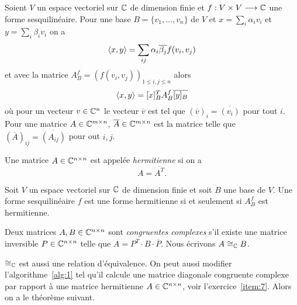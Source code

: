 Soient $V$ un espace vectoriel sur $\mathbb{C}$ de dimension finie et $f: V \times V \longrightarrow \mathbb{C}$ une forme sesquilinéaire. Pour une base  $B = \{v_1,\dots,v_n\}$ de $V$ et $x = \sum_i \alpha_i v_i$ et $y = \sum_i \beta_i v_i$ on a 
\begin{displaymath}
  \langle {x,y} \rangle = \sum_{ij} \alpha_i\overline{\beta_j} f(v_i,v_j)
\end{displaymath}
et avec la matrice $A_B^f = (f(v_i,v_j))_{1 \leq i,j \leq n}$   alors 
\begin{equation}
  \label{eq:9}
  \langle {x,y} \rangle = [x]_B ^T A_B^{f} \overline{[y]_B} 
\end{equation}
où pour un vecteur $v \in \mathbb{C}^n$ le vecteur $\overline{v}$ est tel que $(\overline{v})_i = \overline{(v_i)}$ pour tout $i$. Pour une matrice $A \in \mathbb{C}^{m \times n}$, $\overline{A} \in \mathbb{C}^{m \times n}$ est la matrice telle que 
$\left(\overline{A}\right)_{ij} = \overline{(A_{ij})}$ pour out $i,j$. 
\begin{definition}
  \label{def:17}
  Une matrice $A \in \mathbb{C}^{n \times n}$ est appelée \emph{hermitienne} si on a 
  \begin{displaymath}
    A = \overline{A^T}. 
  \end{displaymath}
\end{definition}


\begin{proposition}
  \label{prop:3}
  Soit  $V$  un espace vectoriel sur $\mathbb{C}$ de dimension finie et soit $B$  une base de $V$. Une forme sesquilinéaire $f$ est une forme hermitienne si et seulement si $A_B^f$ est hermitienne.  
\end{proposition}


\begin{definition}
  \label{def:18}
  Deux matrices $A,B \in \mathbb{C}^{n \times n}$ sont \emph{congruentes complexes} s'il existe une matrice inversible $P \in \mathbb{C}^{n \times n}$ telle que $A = {P^T} \cdot B \cdot \overline{P}$. Nous écrivons $A \cong_{\mathbb{C}} B$.  
\end{definition}
$\cong_{\mathbb{C}}$ est aussi une relation d'équivalence. On peut aussi modifier l'algorithme~\ref{alg:1} tel qu'il calcule une matrice diagonale congruente complexe par rapport à une matrice hermitienne $A \in \mathbb{C}^{n \times n}$,  voir l'exercice~\ref{item:7}. Alors on a le théorème suivant. 

